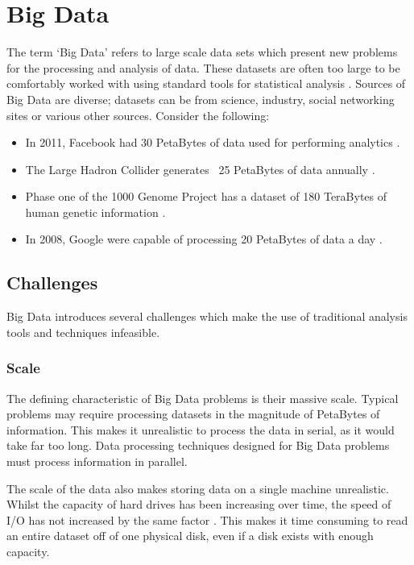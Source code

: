 \section{Big Data}
The term `Big Data' refers to large scale data sets which present new problems for the processing and analysis of data. These datasets are often too large to be comfortably worked with using standard tools for statistical analysis \cite{snijders2012big}. Sources of Big Data are diverse; datasets can be from science, industry, social networking sites or various other sources. Consider the following:

\begin{itemize}
	\item In 2011, Facebook had 30 PetaBytes of data used for performing analytics \cite{facebookBigData}.
	\item The Large Hadron Collider generates ~25 PetaBytes of data annually \cite{lhcData}.
	\item Phase one of the 1000 Genome Project has a dataset of 180 TeraBytes of human genetic information \cite{genomeData}.
	\item In 2008, Google were capable of processing 20 PetaBytes of data a day \cite{dean2008mapreduce}.
\end{itemize}

\subsection{Challenges}
Big Data introduces several challenges which make the use of traditional analysis tools and techniques infeasible.

\subsubsection{Scale}
The defining characteristic of Big Data problems is their massive scale. Typical problems may require processing datasets in the magnitude of PetaBytes of information. This makes it unrealistic to process the data in serial, as it would take far too long. Data processing techniques designed for Big Data problems must process information in parallel. 

The scale of the data also makes storing data on a single machine unrealistic. Whilst the capacity of hard drives has been increasing over time, the speed of I/O has not increased by the same factor \cite{white2009hadoop}. This makes it time consuming to read an entire dataset off of one physical disk, even if a disk exists with enough capacity. 

